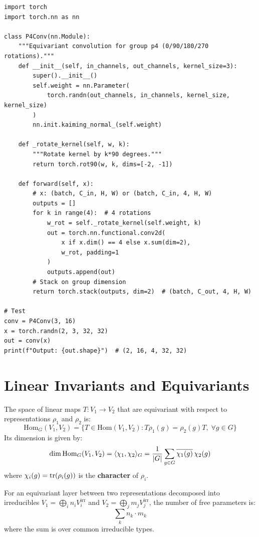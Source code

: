\begin{codeblock}[title=\textbf{G-CNN for group $p4$ (90\textdegree{} rotations)}]
\begin{verbatim}
import torch
import torch.nn as nn

class P4Conv(nn.Module):
    """Equivariant convolution for group p4 (0/90/180/270 rotations)."""
    def __init__(self, in_channels, out_channels, kernel_size=3):
        super().__init__()
        self.weight = nn.Parameter(
            torch.randn(out_channels, in_channels, kernel_size, kernel_size)
        )
        nn.init.kaiming_normal_(self.weight)

    def _rotate_kernel(self, w, k):
        """Rotate kernel by k*90 degrees."""
        return torch.rot90(w, k, dims=[-2, -1])

    def forward(self, x):
        # x: (batch, C_in, H, W) or (batch, C_in, 4, H, W)
        outputs = []
        for k in range(4):  # 4 rotations
            w_rot = self._rotate_kernel(self.weight, k)
            out = torch.nn.functional.conv2d(
                x if x.dim() == 4 else x.sum(dim=2),
                w_rot, padding=1
            )
            outputs.append(out)
        # Stack on group dimension
        return torch.stack(outputs, dim=2)  # (batch, C_out, 4, H, W)

# Test
conv = P4Conv(3, 16)
x = torch.randn(2, 3, 32, 32)
out = conv(x)
print(f"Output: {out.shape}")  # (2, 16, 4, 32, 32)
\end{verbatim}
\end{codeblock}

\section{Linear Invariants and Equivariants}

\begin{theorem}
The space of linear maps $T: V_1 \to V_2$ that are equivariant with respect
to representations $\rho_1$ and $\rho_2$ is:
\[
    \mathrm{Hom}_G(V_1, V_2) = \{T \in \mathrm{Hom}(V_1, V_2) :
    T\rho_1(g) = \rho_2(g)T,\; \forall g \in G\}
\]
Its dimension is given by:
\[
    \dim \mathrm{Hom}_G(V_1, V_2) = \langle \chi_1, \chi_2 \rangle_G
    = \frac{1}{\left| G \right|} \sum_{g \in G} \overline{\chi_1(g)}\, \chi_2(g)
\]
where $\chi_i(g) = \mathrm{tr}(\rho_i(g))$ is the \textbf{character} of $\rho_i$.
\end{theorem}

\begin{corollary}
For an equivariant layer between two representations decomposed into
irreducibles $V_1 = \bigoplus_i n_i V_i^{\text{irr}}$ and
$V_2 = \bigoplus_j m_j V_j^{\text{irr}}$, the number of free parameters is:
\[
    \sum_k n_k \cdot m_k
\]
where the sum is over common irreducible types.
\end{corollary}

